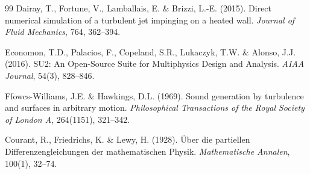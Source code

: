 \documentclass[11pt,a4paper]{article}
\begin{document}
\begin{thebibliography}{99}
  Dairay, T., Fortune, V., Lamballais, E. \& Brizzi, L.-E. (2015).
  Direct numerical simulation of a turbulent jet impinging on a heated wall.
  \textit{Journal of Fluid Mechanics}, 764, 362--394.

  Economon, T.D., Palacios, F., Copeland, S.R., Lukaczyk, T.W. \& Alonso, J.J. (2016).
  SU2: An Open-Source Suite for Multiphysics Design and Analysis.
  \textit{AIAA Journal}, 54(3), 828--846.

  Ffowcs-Williams, J.E. \& Hawkings, D.L. (1969).
  Sound generation by turbulence and surfaces in arbitrary motion.
  \textit{Philosophical Transactions of the Royal Society of London A},
  264(1151), 321--342.

  Courant, R., Friedrichs, K. \& Lewy, H. (1928).
  Über die partiellen Differenzengleichungen der mathematischen Physik.
  \textit{Mathematische Annalen}, 100(1), 32--74.

\end{thebibliography}
\end{document}
